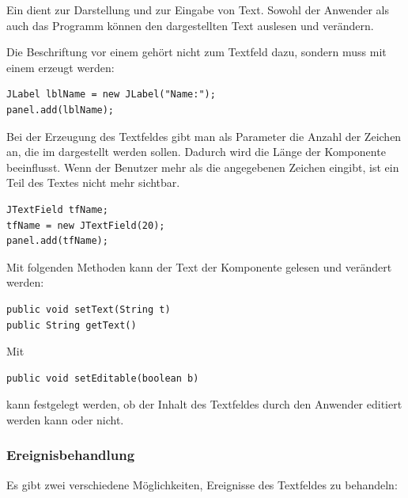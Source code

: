 Ein  dient zur Darstellung und zur Eingabe von Text. Sowohl
der Anwender als auch das Programm können den dargestellten Text auslesen und
verändern.

Die Beschriftung vor einem  gehört nicht zum Textfeld dazu,
sondern muss mit einem  erzeugt werden:

\begin{lstlisting}
JLabel lblName = new JLabel("Name:");
panel.add(lblName);
\end{lstlisting}

Bei der Erzeugung des Textfeldes gibt man als Parameter die Anzahl der Zeichen
an, die im  dargestellt werden sollen. Dadurch wird die
Länge der Komponente beeinflusst. Wenn der Benutzer mehr als die angegebenen
Zeichen eingibt, ist ein Teil des Textes nicht mehr sichtbar.

\begin{lstlisting}
JTextField tfName;
tfName = new JTextField(20);
panel.add(tfName);
\end{lstlisting}

Mit folgenden Methoden kann der Text der Komponente gelesen und verändert werden:

\begin{lstlisting}
public void setText(String t)
public String getText()
\end{lstlisting}

Mit

\begin{lstlisting}
public void setEditable(boolean b)
\end{lstlisting}

kann festgelegt werden, ob der Inhalt des Textfeldes durch den Anwender
editiert werden kann oder nicht.

\subsubsection{Ereignisbehandlung}

Es gibt zwei verschiedene Möglichkeiten, Ereignisse des Textfeldes zu
behandeln:


